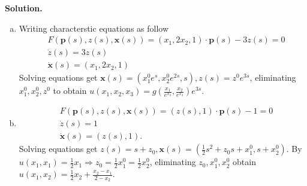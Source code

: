\documentclass[a4paper]{book}
\newenvironment{solution}%
{\noindent\textbf{Solution.}}%
{\qedhere}
\numberwithin{equation}{chapter}
\theoremstyle{definition}
\begin{document}
\begin{solution}
  \begin{enumerate} [(a)]
  \item Writing characterstic equations as follow
    \begin{align*}
      &F(\mathbf{p}(s), z(s), \mathbf{x}(s)) = (x_1,2x_2,1) \cdot \mathbf{p}(s) - 3 z(s) = 0 \\
      &\dot{z}(s) = 3 z(s) \\
      &\dot{\mathbf{x}}(s) = (x_1, 2 x_2, 1) 
    \end{align*}
    Solving equations get $\mathbf{x}(s) = (x^0_1e^{s},x^0_2e^{2s},s), z(s) = z^0 e^{3s}$, eliminating $x^0_1,x^0_2,z^0$ to obtain $u(x_1,x_2,x_3) = g(\frac{x_1}{e^{x_3}}, \frac{x_2}{e^{x_3}}) e^{3s}$.

    \item
      \begin{align*}
        &F(\mathbf{p}(s), z(s), \mathbf{x}(s)) = (z(s),1) \cdot \mathbf{p}(s) - 1 = 0 \\
        &\dot{z}(s) = 1 \\
        &\dot{\mathbf{x}}(s) = (z(s),1).
      \end{align*}
      Solving equations get $z(s) = s + z_0, \mathbf{x}(s) = (\frac{1}{2}s^2 + z_0 s + x^0_1, s + x^0_2)$. By $u(x_1,x_1) = \frac{1}{2}x_1 \Longrightarrow z_0 = \frac{1}{2}x^0_1 = \frac{1}{2}x^0_2$, eliminating $z_0,x^0_1,x^0_2$ obtain $u(x_1,x_2) = \frac{1}{2}x_2 + \frac{x_2 - x_1}{2 - x_2}$.
  \end{enumerate}
\end{solution}
\end{document}
